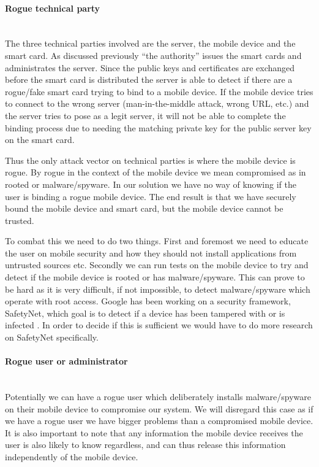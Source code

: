\paragraph{Rogue technical party}\mbox{}\\
The three technical parties involved are the server, the mobile device and the smart card. As discussed previously ``the authority'' issues the smart cards and administrates the server. Since the public keys and certificates are exchanged before the smart card is distributed the server is able to detect if there are a rogue/fake smart card trying to bind to a mobile device. If the mobile device tries to connect to the wrong server (man-in-the-middle attack, wrong URL, etc.) and the server tries to pose as a legit server, it will not be able to complete the binding process due to needing the matching private key for the public server key on the smart card.

Thus the only attack vector on technical parties is where the mobile device is rogue. By rogue in the context of the mobile device we mean compromised as in rooted or malware/spyware. In our solution we have no way of knowing if the user is binding a rogue mobile device. The end result is that we have securely bound the mobile device and smart card, but the mobile device cannot be trusted.

To combat this we need to do two things. First and foremost we need to educate the user on mobile security and how they should not install applications from untrusted sources etc. Secondly we can run tests on the mobile device to try and detect if the mobile device is rooted or has malware/spyware. This can prove to be hard as it is very difficult, if not impossible, to detect malware/spyware which operate with root access. Google has been working on a security framework, SafetyNet, which goal is to detect if a device has been tampered with or is infected \cite{googleSafetynet}. In order to decide if this is sufficient we would have to do more research on SafetyNet specifically.

\paragraph{Rogue user or administrator}\mbox{}\\
Potentially we can have a rogue user which deliberately installs malware/spyware on their mobile device to compromise our system. We will disregard this case as if we have a rogue user we have bigger problems than a compromised mobile device. It is also important to note that any information the mobile device receives the user is also likely to know regardless, and can thus release this information independently of the mobile device.

